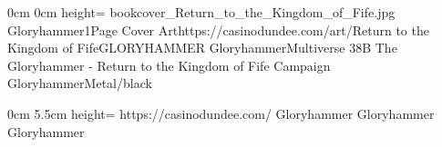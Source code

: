 \documentclass[letterpaper,openany,twoside,twocolumn]{book}
\begin{document}
	\DungeonSheetGeometry

		{0cm}%
		{0cm}%
		{height=\paperheight}%
		{bookcover_Return_to_the_Kingdom_of_Fife.jpg}%
		{%
			{Gloryhammer1}{Page \thepage}{Cover Art}{https://casinodundee.com/art/}{Return to the Kingdom of Fife}{GLORYHAMMER}%
		}%
		{{\darkcrystalfont}{Gloryhammer}{\digitalfont}{Multiverse 38B}}%
		{{\digitalfont}{The Gloryhammer - Return to the Kingdom of Fife Campaign}}%
		{GloryhammerMetal/black}%
	
	\clearpage
	\tableofcontents
	
	\DndSetThemeColor[PhbTan]
	
	
	
		{0cm}									%
		{5.5cm}									%
		{height=\paperheight}					%
		{https://casinodundee.com/}				%
		{Gloryhammer}							%
		{Gloryhammer}							%
		{Gloryhammer}							%
\end{document}
